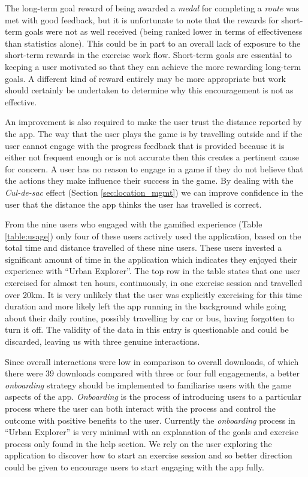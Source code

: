 The long-term goal reward of being awarded a \emph{medal} for
completing a \emph{route} was met with good feedback, but it is
unfortunate to note that the rewards for short-term goals were not as
well received (being ranked lower in terms of effectiveness than
statistics alone). This could be in part to an overall lack of
exposure to the short-term rewards in the exercise work
flow. Short-term goals are essential to keeping a user motivated so
that they can achieve the more rewarding long-term goals. A different
kind of reward entirely may be more appropriate but work should
certainly be undertaken to determine why this encouragement is not as
effective. 

An improvement is also required to make the user trust the distance
reported by the app. The way that the user plays the game is by
travelling outside and if the user cannot engage with the progress
feedback that is provided because it is either not frequent enough or
is not accurate then this creates a pertinent cause for concern. A
user has no reason to engage in a game if they do not believe that the
actions they make influence their success in the game. By dealing with
the \emph{Cul-de-sac} effect (Section \ref{sec:location_mgmt}) we can
improve confidence in the user that the distance the app thinks the
user has travelled is correct. 

From the nine users who engaged with the gamified experience (Table
\ref{table:usage}) only four of these users actively used the
application, based on the total time and distance travelled of these
nine users. These users invested a significant amount of time in the
application which indicates they enjoyed their experience with
``Urban Explorer''. The top row in the table states that one user
exercised for almost ten hours, continuously, in one exercise session
and travelled over 20km. It is very unlikely that the user was
explicitly exercising for this time duration and more likely left the
app running in the background while going about their daily routine,
possibly travelling by car or bus, having forgotten to turn it
off. The validity of the data in this entry is questionable and could
be discarded, leaving us with three genuine interactions. 

Since overall interactions were low in comparison to overall downloads,
of which there were 39 downloads compared with three or four full
engagements, a better \emph{onboarding} strategy should be implemented
to familiarise users with the game aspects of the
app. \emph{Onboarding} is the process of introducing users to a
particular process where the user can both interact with the process
and control the outcome with positive benefits to the user. Currently
the \emph{onboarding} process in ``Urban Explorer'' is very minimal
with an explanation of the goals and exercise process only found in
the help section. We rely on the user exploring the application to
discover how to start an exercise session and so better direction 
could be given to encourage users to start engaging with the app
fully. 

